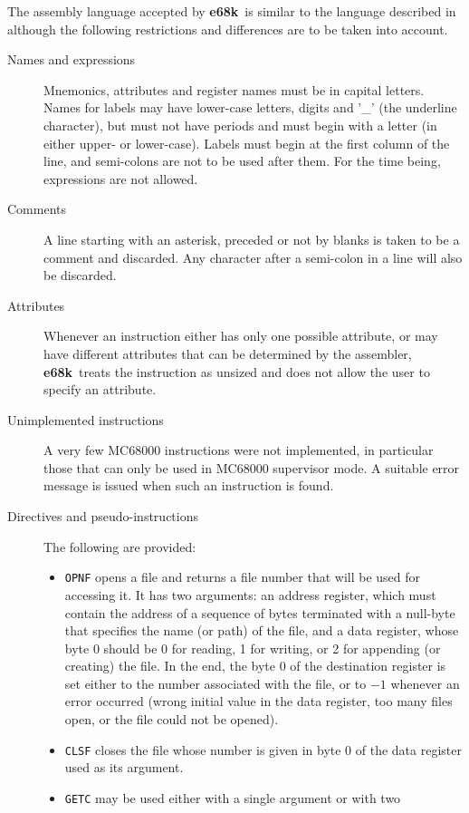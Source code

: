 \documentclass[a4,11pt]{article}
\newcommand{\esek}{{\bf e68k}}
\newcommand{\comm}[1]{{\tt #1}}
\begin{document}
The assembly language accepted by \esek\    is similar to the language
described in \cite{HarmL85} although the following restrictions and
differences are to be taken into account.

\begin{description}
\item[Names and expressions] Mnemonics, attributes and register names
must be in capital letters. Names for labels may have lower-case letters,
digits and '\_' (the underline character), but must not have periods
and must begin with a letter (in either upper- or lower-case). Labels
must begin at the first column of the line, and semi-colons are not
to be used after them. For the
time being, expressions are not allowed.
\item[Comments] A line starting with an asterisk, preceded or not by
blanks is taken to be a comment and discarded. Any character after
a semi-colon in a line will  also be discarded.
\item[Attributes] Whenever an instruction either has only one possible
attribute, or may have different attributes that can be determined by
the assembler, \esek\    treats the instruction as unsized and does not
allow the user to specify an attribute.
\item[Unimplemented instructions] A very few MC68000 instructions
were not implemented, in particular those that can only be used in
MC68000 supervisor mode. A suitable error message is issued when
such an instruction is found.
\item[Directives and pseudo-instructions] The following are provided:
\begin{itemize}
\item \comm{OPNF} opens a file and returns a file number that will be
used for accessing it. It has two arguments: an address register, which
must contain the address of a sequence of bytes terminated with a null-byte
that specifies the name (or path) of the file, and a data register, whose
byte 0 should be 0 for reading, 1 for writing, or 2 for appending (or
creating) the file. In the end, the byte 0 of the destination register
is set either to the number associated with the file, or to $-1$ whenever
an error occurred (wrong initial value in the data register, too many
files open, or the file could not be opened).
\item \comm{CLSF} closes the file whose number is given in byte 0 of
the data register used as its argument.
\item \comm{GETC} may be used either with a single argument or with two

\end{itemize}
\end{description}
\end{document}
